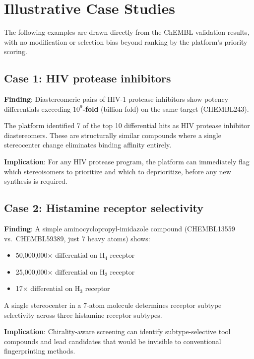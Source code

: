 \documentclass[11pt,a4paper]{article}
\begin{document}
\newpage

\section{Illustrative Case Studies}

The following examples are drawn directly from the ChEMBL validation results,
with no modification or selection bias beyond ranking by the platform's
priority scoring.

\subsection{Case 1: HIV protease inhibitors}

\textbf{Finding}: Diastereomeric pairs of HIV-1 protease inhibitors show
potency differentials exceeding \textbf{$10^9$-fold} (billion-fold) on the
same target (CHEMBL243).

The platform identified 7 of the top 10 differential hits as HIV protease
inhibitor diastereomers. These are structurally similar compounds where a
single stereocenter change eliminates binding affinity entirely.

\textbf{Implication}: For any HIV protease program, the platform can
immediately flag which stereoisomers to prioritize and which to deprioritize,
before any new synthesis is required.

\subsection{Case 2: Histamine receptor selectivity}

\textbf{Finding}: A simple aminocyclopropyl-imidazole compound
(CHEMBL13559 vs.\ CHEMBL59389, just 7 heavy atoms) shows:
\begin{itemize}[leftmargin=1.5em]
  \item 50,000,000$\times$ differential on H$_4$ receptor
  \item 25,000,000$\times$ differential on H$_2$ receptor
  \item 17$\times$ differential on H$_3$ receptor
\end{itemize}

A single stereocenter in a 7-atom molecule determines receptor subtype
selectivity across three histamine receptor subtypes.

\textbf{Implication}: Chirality-aware screening can identify
subtype-selective tool compounds and lead candidates that would be invisible
to conventional fingerprinting methods.
\end{document}
